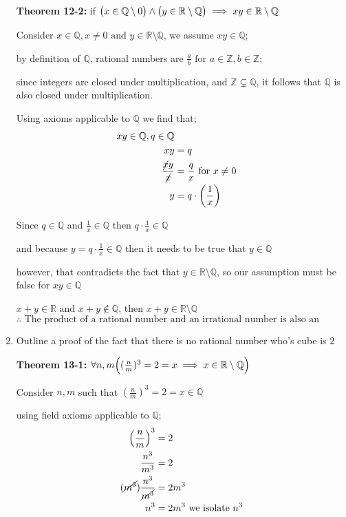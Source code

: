 \documentclass{article}
\newcommand{\paren}[1]{\mathopen{}\left( {#1}_{{}_{}}\,\negthickspace\right)\mathclose{}} %
\begin{document}
\begin{enumerate}[start = 8, label = {\bfseries Problem \arabic*:}, leftmargin=1in]
    \textbf{Theorem 12-2:} if \(\paren{x \in \mathbb{Q} \setminus 0} \land \paren{y \in \mathbb{R \setminus Q}} \implies 
    xy \in \mathbb{R \setminus Q}\)

    Consider \(x \in \mathbb{Q}, x \neq 0 \text{ and } y\in \mathbb{R \setminus Q}\), we assume \(xy \in \mathbb{Q}\); 

    by definition of \(\mathbb{Q}\), rational numbers are \(\frac{a}{b} \text{ for } a \in \mathbb{Z}, b \in \mathbb{Z}\); 

    since integers are closed under multiplication, and \(\mathbb{Z} \subsetneq \mathbb{Q}\), it follows that 
    \(\mathbb{Q}\) is also closed under multiplication.

    Using axioms applicable to \(\mathbb{Q}\) we find that;
    \begin{align*}
        xy \in \mathbb{Q}, q \in \mathbb{Q} \\
        xy &= q \\
        \frac{\cancel{x}y}{\cancel{x}} &= \frac{q}{x} \text{ for } x \neq 0 \\ 
        y &= q \cdot \paren{\frac{1}{x}}
    \end{align*}

    Since \(q \in \mathbb{Q}\) and \(\frac{1}{x} \in \mathbb{Q}\) then \(q \cdot \frac{1}{x} \in \mathbb{Q}\)
    
    and because \(y = q \cdot \frac{1}{x} \in \mathbb{Q}\) then it needs to be true that \(y \in \mathbb{Q}\) 

    however, that contradicts the fact that \(y \in \mathbb{R \setminus Q}\), so our assumption must be false for \(xy 
    \in \mathbb{Q}\)

    \(x + y \in \mathbb{R} \text{ and } x + y \notin \mathbb{Q}\), then \(x + y \in \mathbb{R \setminus Q}\)
    \[
        \therefore \text{ The product of a rational number and an irrational number is also an irrational number}
    \]

    \item Outline a proof of the fact that there is no rational number who's cube is 2

    \textbf{Theorem 13-1:} \(\forall n, m\paren{(\frac{n}{m})^3 = 2 = x \implies x \in \mathbb{R \setminus Q}}\)

    Consider \(n, m\) such that \((\frac{n}{m})^3 = 2 = x \in \mathbb{Q}\)

    using field axioms applicable to \(\mathbb{Q}\);
    \begin{align*}
        \left(\frac{n}{m}\right)^3 &= 2 \\
        \frac{n^3}{m^3} &= 2 \\
        (\cancel{m^3}) \frac{n^3}{\cancel{m^3}} &=  2m^3 \\
        n^3 &= 2m^3 \text{ we isolate } n^3
    \end{align*}
    

\end{enumerate}
\end{document}
